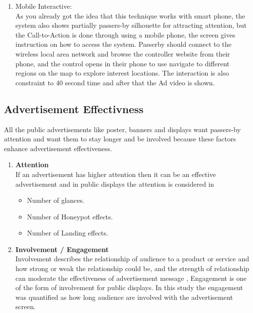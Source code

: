 \begin{itemize}
\begin{enumerate}
\item Mobile Interactive: \\
As you already got the idea that this technique works with smart phone, the system also shows partially passers-by silhouette for attracting attention, but the Call-to-Action is done through using a mobile phone, the screen gives instruction on how to access the system. Passerby should connect to the wireless local area network and browse the controller website from their phone, and the control opens in their phone to use navigate to different regions on the map to explore interest locations. The interaction is also constraint to 40 second time and after that the Ad video is shown.



\end{enumerate}




\end{itemize}



\subsection{Advertisement Effectivness}
All the public advertisements like poster, banners and displays want passers-by attention and want them to stay longer and be involved because these factors enhance advertisement effectiveness.

\begin{enumerate}
\item \textbf{Attention} \\
If an advertisement has higher attention then it can be an effective advertisement\cite{add_effectivenss} and in public displays the attention is considered in 
\begin{itemize}
\item Number of glances.
\item Number of Honeypot effects.
\item Number of Landing effects.
\end{itemize}

\item \textbf{Involvement / Engagement} \\
Involvement describes the relationship of audience to a product or service and how strong or weak the relationship could be\cite{involment}, and the strength of relationship can moderate the effectiveness of advertisement message \cite{ audience_involvement}, Engagement is one of the form of involvement for public displays. In this study the engagement was quantified as how long audience are involved with the advertisement screen.
\end{enumerate}

